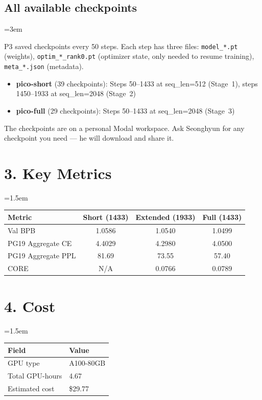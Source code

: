 \documentclass[9pt]{extarticle}
\begin{document}
\subsection*{All available checkpoints}
\leftskip=3em

P3 saved checkpoints every 50 steps. Each step has three files: \texttt{model\_*.pt} (weights), \texttt{optim\_*\_rank0.pt} (optimizer state, only needed to resume training), \texttt{meta\_*.json} (metadata).

\begin{itemize}
  \item \textbf{pico-short} (39 checkpoints): Steps 50--1433 at seq\_len=512 (Stage~1), steps 1450--1933 at seq\_len=2048 (Stage~2)
  \item \textbf{pico-full} (29 checkpoints): Steps 50--1433 at seq\_len=2048 (Stage~3)
\end{itemize}

The checkpoints are on a personal Modal workspace. Ask Seonghyun for any checkpoint you need --- he will download and share it.

\leftskip=0pt
\section*{3. Key Metrics}
\leftskip=1.5em

\begin{tabular}{@{}lccc@{}}
\toprule
Metric & Short (1433) & Extended (1933) & Full (1433) \\
\midrule
Val BPB & 1.0586 & 1.0540 & 1.0499 \\
PG19 Aggregate CE & 4.4029 & 4.2980 & 4.0500 \\
PG19 Aggregate PPL & 81.69 & 73.55 & 57.40 \\
CORE & N/A & 0.0766 & 0.0789 \\
\bottomrule
\end{tabular}

\leftskip=0pt
\section*{4. Cost}
\leftskip=1.5em

\begin{tabular}{@{}ll@{}}
\toprule
Field & Value \\
\midrule
GPU type & A100-80GB \\
Total GPU-hours & 4.67 \\
Estimated cost & \$29.77 \\
\bottomrule
\end{tabular}
\end{document}
